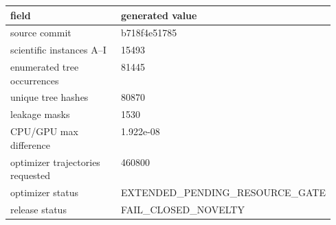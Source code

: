 \begin{tabular}{@{}lp{0.55\linewidth}@{}}
\toprule
field & generated value \\
\midrule
source commit & b718f4e51785 \\
scientific instances A--I & 15493 \\
enumerated tree occurrences & 81445 \\
unique tree hashes & 80870 \\
leakage masks & 1530 \\
CPU/GPU max difference & 1.922e-08 \\
optimizer trajectories requested & 460800 \\
optimizer status & EXTENDED\allowbreak\_PENDING\allowbreak\_RESOURCE\allowbreak\_GATE \\
release status & FAIL\allowbreak\_CLOSED\allowbreak\_NOVELTY \\
\bottomrule
\end{tabular}
